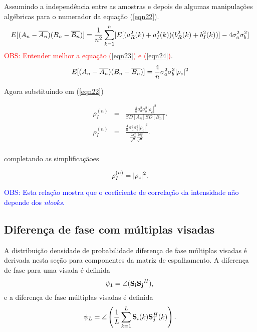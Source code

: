 Assumindo a independência entre as amostras e depois de algumas manipulações algébricas para o numerador da equação (\ref{eqn22}). 
\begin{equation}\label{eqn23}
	E[(A_n-\overline{A_n})(B_n-\overline{B_n})]=\frac{1}{n^2}\sum_{k=1}^{n}[E[(a_{R}^2(k)+a_{I}^2(k))(b_{R}^2(k)+b_{I}^2(k))]-4\sigma_a^2\sigma_b^2] \\
\end{equation}
\textcolor{red}{OBS: Entender melhor a equação (\ref{eqn23}) e (\ref{eqn24})}.
\begin{equation}\label{eqn24}
	E[(A_n-\overline{A_n})(B_n-\overline{B_n})]=\frac{4}{n}\sigma_a^2\sigma_b^2|\rho_c|^2\\
\end{equation}

Agora substituindo em (\ref{eqn22})

\begin{equation}\label{eqn25}
\begin{array}{ccc}
	\rho_I^{(n)}&=&\frac{\frac{4}{n}\sigma_a^2\sigma_b^2|\rho_c|^2}{SD[A_n]SD[B_n]}. \\
	\rho_I^{(n)}&=&\frac{\frac{4}{n}\sigma_a^2\sigma_b^2|\rho_c|^2}{\frac{2\sigma_a^2}{\sqrt{n}}\frac{2\sigma_b^2}{\sqrt{n}}}. \\
\end{array}
\end{equation}

completando as simplificaçãoes

\begin{equation}\label{eqn26}
	\rho_I^{(n)}=|\rho_c|^2. \\
\end{equation}

\textcolor{blue}{OBS: Esta relação mostra que o coeficiente de correlação da intensidade não depende dos {\it nlooks}.}



\subsection{Diferença de fase com múltiplas visadas}

A distribuição densidade de probabilidade diferença de fase múltiplas visadas é derivada nesta seção para componentes da matriz de espalhamento. A diferença de fase para uma visada é definida 
\begin{equation}\label{ap:eq_dif_fase_1look}
	\psi_1=\angle(\mathbf{S_iS_j}^H), \\
\end{equation}
e a diferença de fase múltiplas visadas é definida 
\begin{equation}\label{ap:eq_dif_fase_nlook}
	\psi_L=\angle\left(\frac{1}{L}\sum_{k=1}^{L}\mathbf{S}_i(k)\mathbf{S}_j^H(k)\right). \\
\end{equation} 

